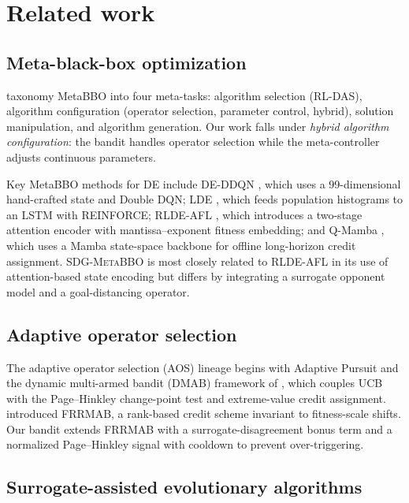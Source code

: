 \documentclass[preprint,12pt,number]{elsarticle}
\newcommand{\sdg}{\textsc{SDG-MetaBBO}}
\begin{document}
\section{Related work}
\label{sec:related}

\subsection{Meta-black-box optimization}

\cite{Ma2025survey} taxonomy MetaBBO into four meta-tasks: algorithm selection (RL-DAS), algorithm configuration (operator selection, parameter control, hybrid), solution manipulation, and algorithm generation. Our work falls under \emph{hybrid algorithm configuration}: the bandit handles operator selection while the meta-controller adjusts continuous parameters.

Key MetaBBO methods for DE include DE-DDQN \cite{Sharma2019}, which uses a 99-dimensional hand-crafted state and Double DQN; LDE \cite{Sun2021}, which feeds population histograms to an LSTM with REINFORCE; RLDE-AFL \cite{Guo2025}, which introduces a two-stage attention encoder with mantissa--exponent fitness embedding; and Q-Mamba \cite{Ma2025qmamba}, which uses a Mamba state-space backbone for offline long-horizon credit assignment. \sdg{} is most closely related to RLDE-AFL in its use of attention-based state encoding but differs by integrating a surrogate opponent model and a goal-distancing operator.

\subsection{Adaptive operator selection}

The adaptive operator selection (AOS) lineage begins with Adaptive Pursuit \cite{Thierens2005} and the dynamic multi-armed bandit (DMAB) framework of \cite{Fialho2010}, which couples UCB with the Page--Hinkley change-point test and extreme-value credit assignment. \cite{Li2014} introduced FRRMAB, a rank-based credit scheme invariant to fitness-scale shifts. Our bandit extends FRRMAB with a surrogate-disagreement bonus term and a normalized Page--Hinkley signal with cooldown to prevent over-triggering.

\subsection{Surrogate-assisted evolutionary algorithms}
\end{document}
